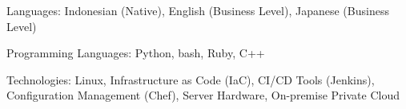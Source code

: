

\begin{cvparagraph}

\begin{cvbullets}
    \item Languages: Indonesian (Native), English (Business Level), Japanese (Business Level)
    \item Programming Languages:  Python, bash, Ruby, C++
    \item Technologies: Linux, Infrastructure as Code (IaC), CI/CD Tools (Jenkins), Configuration Management (Chef), Server Hardware, On-premise Private Cloud
\end{cvbullets}
\end{cvparagraph}
